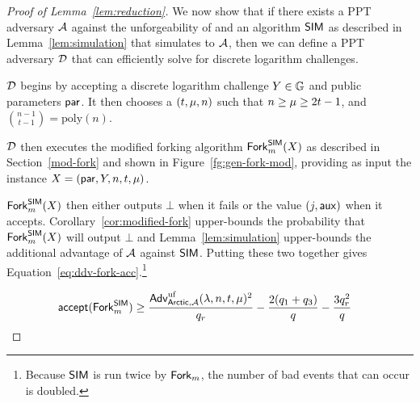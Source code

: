 \begin{proof}[Proof of Lemma~\ref{lem:reduction}]
  We now show that if there exists a PPT adversary $\mathcal{A}$ against the
  unforgeability of \glitter and an algorithm $\mathsf{SIM}$
  as described in Lemma~\ref{lem:simulation} that simulates \glitter to $\mathcal{A}$,
  then we can define a PPT adversary $\mathcal{D}$ that can efficiently solve for discrete logarithm challenges.

  $\mathcal{D}$ begins by accepting a discrete logarithm challenge $Y \in \mathbb{G}$ and public parameters $\mathsf{par}$.
  It then chooses a $(t, \mu, n)$ such that $n \geq \mu \geq 2t-1$,
  and ${n-1\choose t-1} = \text{poly}(n)$.

  $\mathcal{D}$ then executes the modified forking algorithm $\mathsf{Fork}_m^{\mathsf{SIM}}(X)$ as described in Section~\ref{mod-fork} and shown in Figure~\ref{fg:gen-fork-mod},
  providing as input the instance $X = (\mathsf{par}, Y, n, t, \mu)$.

  $\mathsf{Fork}_m^{\mathsf{SIM}}(X)$ then either outputs $\bot$ when it fails or the value $(j, \mathsf{aux})$ when it accepts.
  Corollary~\ref{cor:modified-fork} upper-bounds the probability that $\mathsf{Fork}_m^{\mathsf{SIM}}(X)$ will output $\bot$
  and Lemma~\ref{lem:simulation} upper-bounds the additional advantage of $\mathcal{A}$ against $\mathsf{SIM}$.
  Putting these two together gives Equation~\ref{eq:ddv-fork-acc}.\footnote{Because $\mathsf{SIM}$ is run twice by $\mathsf{Fork}_m$, the number of bad events that can occur is doubled.}


    \begin{align}
      \label{eq:ddv-fork-acc}
    \begin{split}
        \mathsf{accept}(\mathsf{Fork}_m^{\mathsf{SIM}}) & \geq
        \frac{\textsf{\upshape Adv}^{\textrm{\upshape uf}}_{\mathsf{Arctic},\mathcal{A}}(\lambda, n, t, \mu)^2}{q_r}
        - \frac{2(q_1 + q_3)}{q}
        - \frac{3q_r^2}{q}
    \end{split}
    \end{align}



\end{proof}
